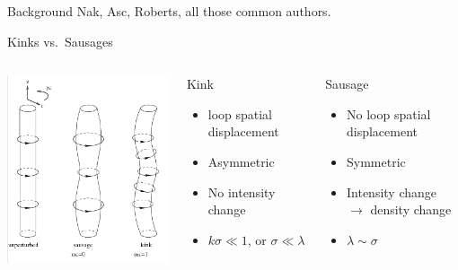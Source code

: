 \documentclass[table]{beamer}
\begin{document}
\begin{frame}{Background}
    Nak, Asc, Roberts, all those common authors.
\end{frame}%

\begin{frame}{Kinks vs.\ Sausages}
\begin{columns}
    \includegraphics[width=2.5in]{kink_saus.png}
    \begin{block}{Kink}
        \begin{itemize}
            \item loop spatial displacement
            \item Asymmetric
            \item No intensity change
            \item $k\sigma \ll 1$, or $\sigma\ll\lambda$
        \end{itemize}
    \end{block}
    \begin{block}{Sausage}
        \begin{itemize}
            \item No loop spatial displacement
            \item Symmetric
            \item Intensity change\\ $\rightarrow$ density change
            \item $\lambda\sim\sigma$
        \end{itemize}
    \end{block}
\end{columns}
\end{frame}%
\end{document}
